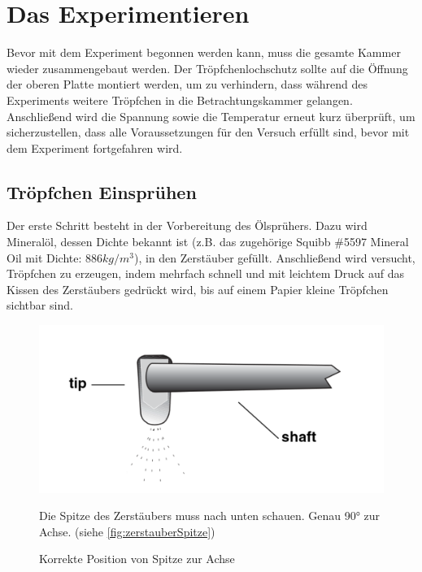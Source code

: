 \section{Das Experimentieren}\label{sec:durchfuehrung}
Bevor mit dem Experiment begonnen werden kann, muss die gesamte Kammer wieder zusammengebaut werden. Der Tröpfchenlochschutz sollte auf die Öffnung der oberen Platte montiert werden, um zu verhindern, dass während des Experiments weitere Tröpfchen in die Betrachtungskammer gelangen. Anschließend wird die Spannung sowie die Temperatur erneut kurz überprüft, um sicherzustellen, dass alle Voraussetzungen für den Versuch erfüllt sind, bevor mit dem Experiment fortgefahren wird.

\subsection{Tröpfchen Einsprühen}\label{sub:tröpfchensprühen}
Der erste Schritt besteht in der Vorbereitung des Ölsprühers. Dazu wird Mineralöl, dessen Dichte bekannt ist (z.B. das zugehörige Squibb \#5597 Mineral Oil mit Dichte: $886 kg/m^3$), in den Zerstäuber gefüllt. Anschließend wird versucht, Tröpfchen zu erzeugen, indem mehrfach schnell und mit leichtem Druck auf das Kissen des Zerstäubers gedrückt wird, bis auf einem Papier kleine Tröpfchen sichtbar sind.
\begin{figure}[h]
	\begin{minipage}[t]{0.45\textwidth}
		\centering
		\includegraphics[width=\textwidth]{bilder/pdf/zerstauberSpitze.pdf}
		\caption{Korrekte Position von Spitze zur Achse}
		\label{fig:zerstauberSpitze}
	\end{minipage}
	\hfill
	\begin{minipage}[t]{0.45\textwidth}
		Die Spitze des Zerstäubers muss nach unten schauen. Genau 90° zur Achse. (siehe \autoref{fig:zerstauberSpitze})
	\end{minipage} 
\end{figure}


